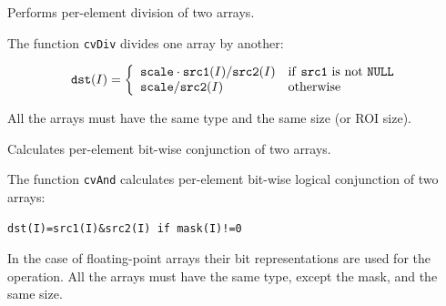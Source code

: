 \label{Div}

Performs per-element division of two arrays.


\begin{description}
\end{description}

The function \texttt{cvDiv} divides one array by another:

\[
\texttt{dst}(I)=\left\{ \begin{array}{l l} \texttt{scale} \cdot \texttt{src1}(I)/\texttt{src2}(I) & \mbox{if \texttt{src1} is not \texttt{NULL}}\\ \texttt{scale}/\texttt{src2}(I) & \mbox{otherwise}\\ \end{array} \right.
\]

All the arrays must have the same type and the same size (or ROI size).


\label{And}

Calculates per-element bit-wise conjunction of two arrays.


\begin{description}
\end{description}


The function \texttt{cvAnd} calculates per-element bit-wise logical conjunction of two arrays:

\begin{lstlisting}
dst(I)=src1(I)&src2(I) if mask(I)!=0
\end{lstlisting}

In the case of floating-point arrays their bit representations are used for the operation. All the arrays must have the same type, except the mask, and the same size.

\label{AndS}

